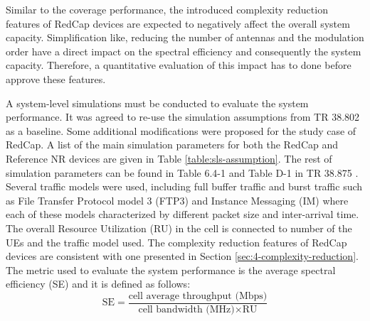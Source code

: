 \documentclass[conference]{IEEEtran}
\begin{document}
Similar to the coverage performance, the introduced complexity reduction features of RedCap devices are expected to negatively affect the overall system capacity. Simplification like, reducing the number of antennas and the modulation order have a direct impact on the spectral efficiency and consequently the system capacity. Therefore, a quantitative evaluation of this impact has to done before approve these features.

A system-level simulations must be conducted to evaluate the system performance. It was agreed to re-use the simulation assumptions from TR 38.802 \cite{3gpp_study_nodate-2_38.802} as a baseline. Some additional modifications were proposed for the study case of RedCap. A list of the main simulation parameters for both the RedCap and Reference NR devices are given in Table \ref{table:sls-assumption}. The rest of simulation parameters can be found in Table 6.4-1 and Table D-1 in TR 38.875 \cite{3gpp.38.875}. Several traffic models were used, including full buffer traffic and burst traffic such as File Transfer Protocol model 3 (FTP3) and Instance Messaging (IM) where each of these models characterized by different packet size and inter-arrival time. The overall Resource Utilization (RU) in the cell is connected to number of the UEs and the traffic model used. The complexity reduction features of RedCap devices are consistent with one presented in Section \ref{sec:4-complexity-reduction}. The metric used to evaluate the system performance is the average spectral efficiency (SE) and it is defined as follows:
\begin{equation}
\textrm{SE}=\frac{\textrm{cell average throughput (Mbps)}}{\textrm{cell bandwidth (MHz)}\times\textrm{RU}}
\label{equ:spectral-efficiency}
\end{equation}
\end{document}
